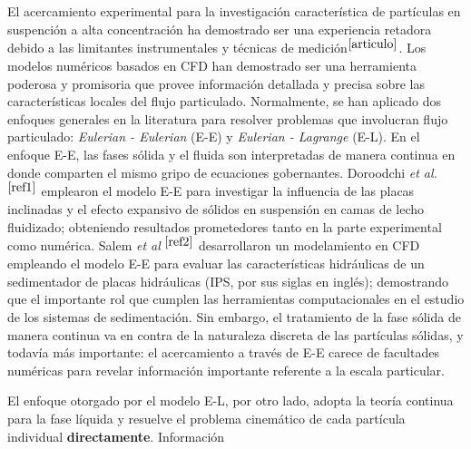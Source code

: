 El acercamiento experimental para la investigaci\'on caracter\'istica de part\'iculas en suspenci\'on a alta concentraci\'on ha demostrado ser una experiencia retadora debido a las limitantes instrumentales y t\'ecnicas de medici\'on$^{\cite{articulo}}$. Los modelos num\'ericos basados en CFD han demostrado ser una herramienta poderosa y promisoria que provee informaci\'on detallada y precisa sobre las caracter\'isticas locales del flujo particulado. Normalmente, se han aplicado dos enfoques generales en la literatura para resolver problemas que involucran flujo particulado: \textit{Eulerian - Eulerian} (E-E) y \textit{Eulerian - Lagrange} (E-L). En el enfoque E-E, las fases s\'olida y el fluida son interpretadas de manera continua en donde comparten el mismo gripo de ecuaciones gobernantes. Doroodchi \textit{et al.}$^{\cite{ref1}}$ emplearon el modelo E-E para investigar la influencia de las placas inclinadas y el efecto expansivo de s\'olidos en suspensi\'on en camas de lecho fluidizado; obteniendo resultados prometedores tanto en la parte experimental como num\'erica. Salem \textit{et al} $^{\cite{ref2}}$ desarrollaron un modelamiento en CFD empleando el modelo E-E para evaluar las caracter\'isticas hidr\'aulicas de un sedimentador de placas hidr\'aulicas (IPS, por sus siglas en ingl\'es); demostrando que el importante rol que cumplen las herramientas computacionales en el estudio de los sistemas de sedimentaci\'on. Sin embargo, el tratamiento de la fase s\'olida de manera continua va en contra de la naturaleza discreta de las part\'iculas s\'olidas, y todav\'ia m\'as importante: el acercamiento a trav\'es de E-E carece de facultades num\'ericas para revelar informaci\'on importante referente a la escala particular.

\noindent
\justify

El enfoque otorgado por el modelo E-L, por otro lado, adopta la teor\'ia continua para la fase l\'iquida y resuelve el problema cinem\'atico de cada part\'icula individual \textbf{directamente}. Informaci\'on 
